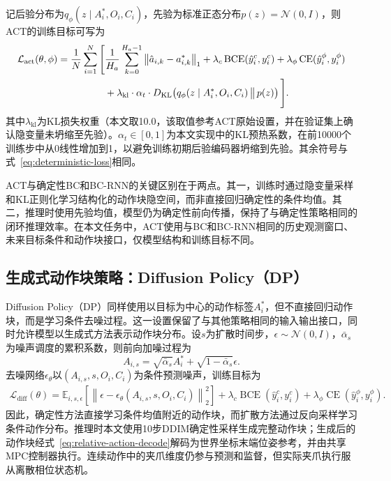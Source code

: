 记后验分布为$q_\phi(z\mid A_i^*,O_i,C_i)$，先验为标准正态分布$p(z)=\mathcal{N}(0,I)$，则ACT的训练目标可写为
\begin{align}
    \mathcal{L}_{\mathrm{act}}(\theta,\phi)
    = \frac{1}{N}\sum_{i=1}^{N}
    \Bigg[
        &\frac{1}{H_a}\sum_{k=0}^{H_a-1}
        \left\|\hat{a}_{i,k}-a^*_{i,k}\right\|_1
        + \lambda_c\operatorname{BCE}(\hat{y}^c_i,y^c_i)
        + \lambda_\phi\operatorname{CE}(\hat{y}^\phi_i,y^\phi_i) \notag\\
        &+ \lambda_{\mathrm{kl}}\cdot\alpha_t\cdot
        D_{\mathrm{KL}}\!\left(q_\phi(z\mid A_i^*,O_i,C_i)\,\big\|\,p(z)\right)
    \Bigg].
    \label{eq:cvae-loss}
\end{align}
其中$\lambda_{\mathrm{kl}}$为KL损失权重（本文取10.0，该取值参考ACT原始设置\citep{zhao2023learning}，并在验证集上确认隐变量未坍缩至先验）。$\alpha_t\in[0,1]$为本文实现中的KL预热系数，在前10000个训练步中从0线性增加到1，以避免训练初期后验编码器坍缩到先验。其余符号与式~\eqref{eq:deterministic-loss}相同。

ACT与确定性BC和BC-RNN的关键区别在于两点。其一，训练时通过隐变量采样和KL正则化学习结构化的动作块隐空间，而非直接回归确定性的条件均值。其二，推理时使用先验均值，模型仍为确定性前向传播，保持了与确定性策略相同的闭环推理效率。在本文任务中，ACT使用与BC和BC-RNN相同的历史观测窗口、未来目标条件和动作块接口，仅模型结构和训练目标不同。

\subsection{生成式动作块策略：Diffusion Policy（DP）}

Diffusion Policy（DP）同样使用以目标为中心的动作标签$A_i^*$，但不直接回归动作块，而是学习条件去噪过程\citep{ho2020denoising,chi2023diffusion}。这一设置保留了与其他策略相同的输入输出接口，同时允许模型以生成式方法表示动作块分布。设$s$为扩散时间步，$\epsilon\sim\mathcal{N}(0,I)$，$\bar{\alpha}_s$为噪声调度的累积系数，则前向加噪过程为
\begin{equation}
    A_{i,s}=\sqrt{\bar{\alpha}_s}A_i^*+\sqrt{1-\bar{\alpha}_s}\epsilon.
    \label{eq:diffusion-forward}
\end{equation}
去噪网络$\epsilon_\theta$以$(A_{i,s},s,O_i,C_i)$为条件预测噪声，训练目标为
\begin{align}
    \mathcal{L}_{\mathrm{diff}}(\theta)
    =\mathbb{E}_{i,s,\epsilon}\left[
        \left\|\epsilon-\epsilon_\theta(A_{i,s},s,O_i,C_i)\right\|_2^2
    \right]
    +\lambda_c\operatorname{BCE}(\hat{y}^c_i,y^c_i)
    +\lambda_\phi\operatorname{CE}(\hat{y}^\phi_i,y^\phi_i).
    \label{eq:diffusion-loss}
\end{align}
因此，确定性方法直接学习条件均值附近的动作块，而扩散方法通过反向采样学习条件动作分布。推理时本文使用10步DDIM确定性采样\citep{song2021denoising}生成完整动作块；生成后的动作块经式~\eqref{eq:relative-action-decode}解码为世界坐标末端位姿参考，并由共享MPC控制器执行。连续动作中的夹爪维度仍参与预测和监督，但实际夹爪执行服从离散相位状态机。

